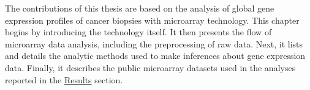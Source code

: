 The contributions of this thesis are based on the analysis of global gene
expression profiles of cancer biopsies with microarray technology.  This chapter
begins by introducing the technology itself.  It then presents the flow of
microarray data analysis, including the preprocessing of raw data.  Next, it
lists and details the analytic methods used to make inferences about gene
expression data. Finally, it describes the public microarray datasets used in
the analyses reported in the \hyperref[chap:results]{\textsf{Results}} section.






